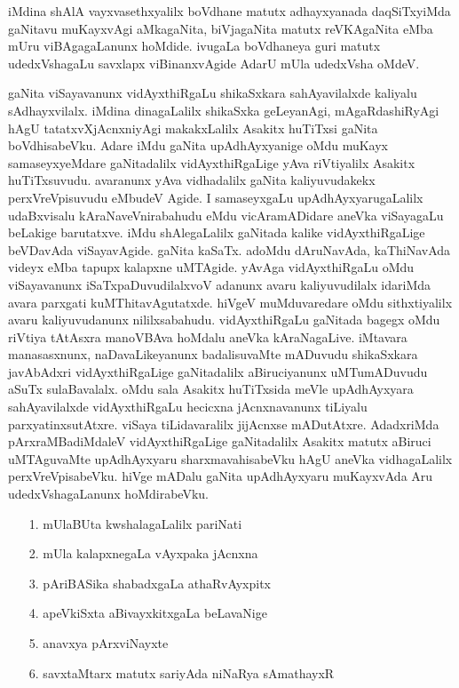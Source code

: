 iMdina shAlA vayxvasethxyalilx boVdhane matutx adhayxyanada daqSiTxyiMda gaNitavu muKayxvAgi aMkagaNita, biVjagaNita matutx reVKAgaNita eMba mUru viBAgagaLanunx hoMdide. ivugaLa boVdhaneya guri matutx udedxVshagaLu savxlapx viBinanxvAgide AdarU mUla udedxVsha oMdeV.

gaNita viSayavanunx vidAyxthiRgaLu shikaSxkara sahAyavilalxde kaliyalu sAdhayxvilalx. iMdina dinagaLalilx shikaSxka geLeyanAgi, mAgaRdashiRyAgi hAgU tatatxvXjAcnxniyAgi makakxLalilx Asakitx huTiTxsi gaNita boVdhisabeVku. Adare iMdu gaNita upAdhAyxyanige oMdu muKayx samaseyxyeMdare gaNitadalilx vidAyxthiRgaLige yAva riVtiyalilx Asakitx huTiTxsuvudu. avaranunx yAva vidhadalilx gaNita kaliyuvudakekx perxVreVpisuvudu eMbudeV Agide. I samaseyxgaLu upAdhAyxyarugaLalilx udaBxvisalu kAraNaveVnirabahudu eMdu vicAramADidare aneVka viSayagaLu beLakige barutatxve. iMdu shAlegaLalilx gaNitada kalike vidAyxthiRgaLige beVDavAda viSayavAgide. gaNita kaSaTx. adoMdu dAruNavAda, kaThiNavAda videyx eMba tapupx kalapxne uMTAgide. yAvAga vidAyxthiRgaLu oMdu viSayavanunx iSaTxpaDuvudilalxvoV adanunx avaru kaliyuvudilalx idariMda avara parxgati kuMThitavAgutatxde. hiVgeV muMduvaredare oMdu sithxtiyalilx avaru kaliyuvudanunx nililxsabahudu. vidAyxthiRgaLu gaNitada bagegx oMdu riVtiya tAtAsxra manoVBAva hoMdalu aneVka kAraNagaLive. iMtavara manasasxnunx, naDavaLikeyanunx badalisuvaMte mADuvudu shikaSxkara javAbAdxri vidAyxthiRgaLige gaNitadalilx aBiruciyanunx uMTumADuvudu aSuTx sulaBavalalx. oMdu sala Asakitx huTiTxsida meVle upAdhAyxyara sahAyavilalxde vidAyxthiRgaLu hecicxna jAcnxnavanunx tiLiyalu parxyatinxsutAtxre. viSaya tiLidavaralilx jijAcnxse mADutAtxre. AdadxriMda pArxraMBadiMdaleV vidAyxthiRgaLige gaNitadalilx Asakitx matutx aBiruci uMTAguvaMte upAdhAyxyaru sharxmavahisabeVku hAgU aneVka vidhagaLalilx perxVreVpisabeVku. hiVge mADalu gaNita upAdhAyxyaru muKayxvAda Aru udedxVshagaLanunx hoMdirabeVku.
\begin{enumerate}
\item[{\rm 1.}] mUlaBUta kwshalagaLalilx pariNati
\item[{\rm 2.}] mUla kalapxnegaLa vAyxpaka jAcnxna
\item[{\rm 3.}] pAriBASika shabadxgaLa athaRvAyxpitx
\item[{\rm 4.}] apeVkiSxta aBivayxkitxgaLa beLavaNige
\item[{\rm 5.}] anavxya pArxviNayxte
\item[{\rm 6.}] savxtaMtarx matutx sariyAda niNaRya sAmathayxR
\end{enumerate}

